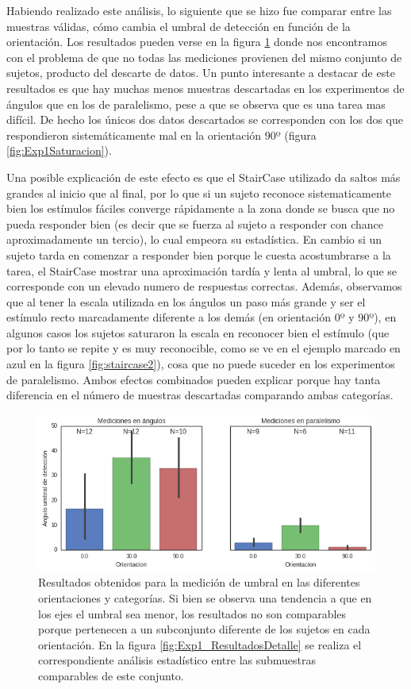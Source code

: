 \documentclass{article}
\numberwithin{figure}{section}
\begin{document}
    Habiendo realizado este análisis, lo siguiente que se hizo fue comparar entre las muestras válidas, cómo cambia el umbral de detección en función de la orientación. Los resultados pueden verse en la figura \ref{fig:Exp1Resultados} donde nos encontramos con el problema de que no todas las mediciones provienen del mismo conjunto de sujetos, producto del descarte de datos. Un punto interesante a destacar de este resultados es que hay muchas menos muestras descartadas en los experimentos de ángulos que en los de paralelismo, pese a que se observa que es una tarea mas difícil. De hecho los únicos dos datos descartados se corresponden con los dos que respondieron sistemáticamente mal en la orientación 90º (figura \ref{fig:Exp1Saturacion}). 
    
    Una posible explicación de este efecto es que el StairCase utilizado da saltos más grandes al inicio que al final, por lo que si un sujeto reconoce sistematicamente bien los estímulos fáciles converge rápidamente a la zona donde se busca que no pueda responder bien (es decir que se fuerza al sujeto a responder con chance aproximadamente un tercio), lo cual empeora su estadística. En cambio si un sujeto tarda en comenzar a responder bien porque le cuesta acostumbrarse a la tarea, el StairCase mostrar una aproximación tardía y lenta al umbral, lo que se corresponde con un elevado numero de respuestas correctas. Además, observamos que al tener la escala utilizada en los ángulos un paso más grande y ser el estímulo recto marcadamente diferente a los demás (en orientación 0º y 90º), en algunos casos los sujetos saturaron la escala en reconocer bien el estímulo (que por lo tanto se repite y es muy reconocible, como se ve en el ejemplo marcado en azul en la figura \ref{fig:staircase2}), cosa que no puede suceder en los experimentos de paralelismo. Ambos efectos combinados pueden explicar porque hay tanta diferencia en el número de muestras descartadas comparando ambas categorías. 
    
    \begin{figure}
        \center
        \includegraphics[width=\textwidth]{Imagenes/Exp1_Resultados.png}
        \caption{Resultados obtenidos para la medición de umbral en las diferentes orientaciones y categorías. Si bien se observa una tendencia a que en los ejes el umbral sea menor, los resultados no son comparables porque pertenecen a un subconjunto diferente de los sujetos en cada orientación. En la figura \ref{fig:Exp1_ResultadosDetalle} se realiza el correspondiente análisis estadístico entre las submuestras comparables de este conjunto.}
        \label{fig:Exp1Resultados}
    \end{figure}  
	
\end{document}
